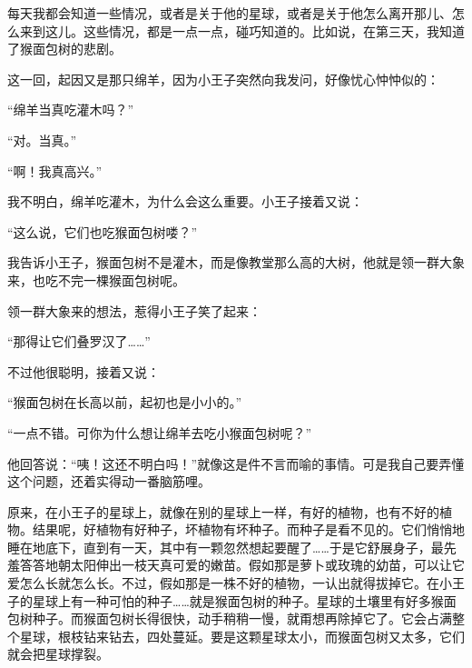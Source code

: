 
\stoptitle

\starttitle[title={5},reference={part0007.html_a008}]

每天我都会知道一些情况，或者是关于他的星球，或者是关于他怎么离开那儿、怎么来到这儿。这些情况，都是一点一点，碰巧知道的。比如说，在第三天，我知道了猴面包树的悲剧。

这一回，起因又是那只绵羊，因为小王子突然向我发问，好像忧心忡忡似的：

“绵羊当真吃灌木吗？”

“对。当真。”

“啊！我真高兴。”

我不明白，绵羊吃灌木，为什么会这么重要。小王子接着又说：

“这么说，它们也吃猴面包树喽？”

我告诉小王子，猴面包树不是灌木，而是像教堂那么高的大树，他就是领一群大象来，也吃不完一棵猴面包树呢。

领一群大象来的想法，惹得小王子笑了起来：

“那得让它们叠罗汉了\ldots{}\ldots{}”

{\startalignment[center]
 \stopalignment}

{\startalignment[center]
 \stopalignment}

不过他很聪明，接着又说：

“猴面包树在长高以前，起初也是小小的。”

“一点不错。可你为什么想让绵羊去吃小猴面包树呢？”

他回答说：“咦！这还不明白吗！”就像这是件不言而喻的事情。可是我自己要弄懂这个问题，还着实得动一番脑筋哩。

原来，在小王子的星球上，就像在别的星球上一样，有好的植物，也有不好的植物。结果呢，好植物有好种子，坏植物有坏种子。而种子是看不见的。它们悄悄地睡在地底下，直到有一天，其中有一颗忽然想起要醒了\ldots{}\ldots{}于是它舒展身子，最先羞答答地朝太阳伸出一枝天真可爱的嫩苗。假如那是萝卜或玫瑰的幼苗，可以让它爱怎么长就怎么长。不过，假如那是一株不好的植物，一认出就得拔掉它。在小王子的星球上有一种可怕的种子\ldots{}\ldots{}就是猴面包树的种子。星球的土壤里有好多猴面包树种子。而猴面包树长得很快，动手稍稍一慢，就甭想再除掉它了。它会占满整个星球，根枝钻来钻去，四处蔓延。要是这颗星球太小，而猴面包树又太多，它们就会把星球撑裂。

